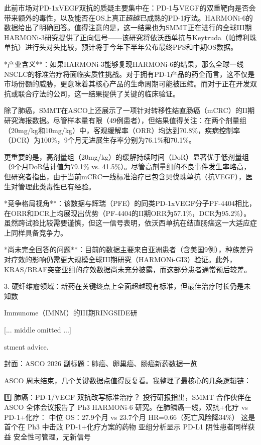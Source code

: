 \documentclass[11pt]{ctexart}
\begin{document}
此前市场对PD-1xVEGF双抗的质疑主要集中在：PD-1与VEGF的双重靶向是否会带来额外的毒性，以及能否在OS上真正超越已成熟的PD-1疗法。HARMONi-6的数据给出了明确回答。值得注意的是，这一结果也为SMMT正在进行的全球III期HARMONi-3研究提供了正向信号——该研究将依沃西单抗与Keytruda（帕博利珠单抗）进行头对头比较，预计将于今年下半年公布最终PFS和中期OS数据。

*产业含义**：如果HARMONi-3能够复现HARMONi-6的结果，那么全球一线NSCLC的标准治疗将面临实质性挑战。对于拥有PD-1产品的药企而言，这不仅是市场份额的威胁，更意味着其核心产品的生命周期可能被压缩。而对于正在开发双抗或联合疗法的公司，这一结果提供了关键的临床验证。

除了肺癌，SMMT在ASCO上还展示了一项针对转移性结直肠癌（mCRC）的II期研究海报数据。尽管样本量有限（49例患者），但结果值得关注：在两个剂量组（20mg/kg和10mg/kg）中，客观缓解率（ORR）均达到70.8\%，疾病控制率（DCR）为100\%，9个月无进展生存率分别为76.1\%和70.1\%。

更重要的是，高剂量组（20mg/kg）的缓解持续时间（DoR）显著优于低剂量组（9个月DoR估计值为79.1\% vs. 41.5\%）。尽管高剂量组的不良事件发生率略高，但研究者指出，由于当前mCRC一线标准治疗已包含贝伐珠单抗（抗VEGF），医生对管理此类毒性已有经验。

*竞争格局视角**：该数据与辉瑞（PFE）的同类PD-1xVEGF分子PF-4404相比，在ORR和DCR上均展现出优势（PF-4404的II期ORR为57.1\%，DCR为95.2\%）。虽然跨试验比较需要谨慎，但这一信号表明，依沃西单抗在结直肠癌这一大适应症上同样具备竞争力。

*尚未完全回答的问题**：目前的数据主要来自亚洲患者（含美国9例），种族差异对疗效的影响仍需更大规模全球III期研究（HARMONi-GI3）验证。此外，KRAS/BRAF突变亚组的疗效数据尚未充分披露，而这部分患者通常预后较差。

3. 硬纤维瘤领域：新药在关键终点上全面超越现有标准，但最佳治疗时长仍是未知数

Immunome（IMNM）的III期RINGSIDE研

[... middle omitted ...]

stment advice.

封面：ASCO 2026 副标题：肺癌、卵巢癌、肠癌新药数据一览

ASCO 周末结束，几个关键数据点值得反复看。我整理了最核心的几条逻辑链：

1️⃣ 肺癌：PD-1/VEGF 双抗改写标准治疗？ 投行研报指出，SMMT 合作伙伴在 ASCO 全体会议报告了 Ph3 HARMONi-6 研究。在肺鳞癌一线，双抗+化疗 vs PD-1+化疗： 中位 OS：27.9个月 vs 23.7个月 HR=0.66（死亡风险降34\%） 这是首个在 Ph3 中击败 PD-1+化疗方案的药物 亚组分析显示 PD-L1 阴性患者同样获益 安全性可管理，无新信号
\end{document}
